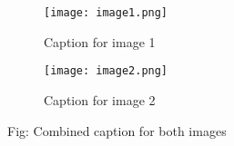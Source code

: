 \documentclass[12pt, a4paper]{article}
\begin{document}
	\begin{figure}
		\centering
		\begin{subfigure}{0.45\linewidth}
			\texttt{[image: image1.png]}
			\caption{Caption for image 1}
			\label{fig:subfig1}
		\end{subfigure}
		\hfill
		\begin{subfigure}{0.45\linewidth}
			\texttt{[image: image2.png]}
			\caption{Caption for image 2}
			\label{fig:subfig2}
		\end{subfigure}
		\caption*{Fig: Combined caption for both images}
		\label{fig:subfigures}
	\end{figure}
	
\end{document}
